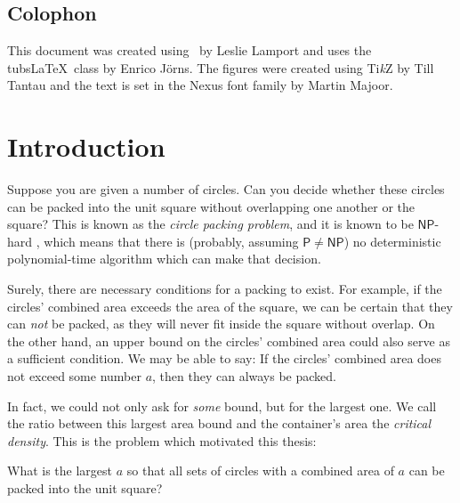 \documentclass[a4paper,style=print,bibliography=totoc,nexus,lnum,extramargin]{tubsbook}
\begin{document}
\section*{Colophon}

This document was created using \LaTeXe\ by Leslie Lamport and uses the tubs\LaTeX\ class by Enrico Jörns. The figures were created using Ti\textit{k}Z by Till Tantau and the text is set in the Nexus font family by Martin Majoor.

\cleardoublepage
\setcounter{tocdepth}{1}

\tableofcontents
\cleardoublepage

\mainmatter

\chapter{Introduction}

Suppose you are given a number of circles. Can you decide whether these circles can be packed into the unit square without overlapping one another or the square? This is known as the \emph{circle packing problem}, and it is known to be $\mathsf{NP}$-hard \cite{DFL2010circle}, which means that there is (probably, assuming $\mathsf{P} \ne \mathsf{NP}$) no deterministic polynomial-time algorithm which can make that decision.


Surely, there are necessary conditions for a packing to exist. For example, if the circles' combined area exceeds the area of the square, we can be certain that they can \emph{not} be packed, as they will never fit inside the square without overlap.
On the other hand, an upper bound on the circles' combined area could also serve as a sufficient condition. We may be able to say: If the circles' combined area does not exceed some number $a$, then they can always be packed.

In fact, we could not only ask for \emph{some} bound, but for the largest one. We call the ratio between this largest area bound and the container's area the \emph{critical density}. This is the problem which motivated this thesis:

\begin{problem}\label{prb:1}
    What is the largest $a$ so that all sets of circles with a combined area of $a$ can be packed into the unit square?
\end{problem}
\end{document}

